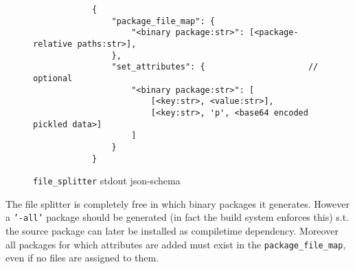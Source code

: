 \documentclass[a4paper]{scrartcl}
\begin{document}
	\begin{figure}[htp]
		\centering
		
		\begin{minipage}{0.8\textwidth}
			\begin{lstlisting}
			{
				"package_file_map": {
					"<binary package:str>": [<package-relative paths:str>],
				},
				"set_attributes": {						// optional
					"<binary package:str>": [
						[<key:str>, <value:str>],
						[<key:str>, 'p', <base64 encoded pickled data>]
					]
				}
			}
			\end{lstlisting}
		\end{minipage}
		
		\caption{\texttt{file\_splitter} stdout json-schema}
		\label{fig:file_splitter_stdout_schema}
	\end{figure}

	The file splitter is completely free in which binary packages it generates. However a \texttt{'-all'} package should be generated (in fact the build system enforces this) s.t. the source package can later be installed as compiletime dependency. Moreover all packages for which attributes are added must exist in the \texttt{package\_file\_map}, even if no files are assigned to them.
	
\end{document}
